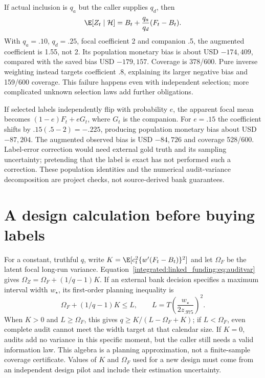 If actual inclusion is $q_a$ but the caller supplies $q_d$, then
\begin{equation}
 \E[Z_t\mid\mathcal H]
  =B_t+\frac{q_a}{q_d}(F_t-B_t).\label{integrated:linked_funding:eq:wrongq}
\end{equation}
With $q_a=.10$, $q_d=.25$, focal coefficient 2 and companion .5, the
augmented coefficient is 1.55, not 2. Its population monetary bias is about
USD $-174{,}409$, compared with the saved bias USD $-179{,}157$. Coverage
is 378/600. Pure inverse weighting instead targets coefficient .8, explaining
its larger negative bias and 159/600 coverage. This failure happens even
with independent selection; more complicated unknown selection laws add
further obligations.

If selected labels independently flip with probability $e$, the apparent
focal mean becomes $(1-e)F_t+eG_t$, where $G_t$ is the companion. For $e=.15$
the coefficient shifts by $.15(.5-2)=-.225$, producing population monetary
bias about USD $-87{,}204$. The augmented observed bias is USD $-84{,}726$
and coverage 528/600. Label-error correction would need external gold truth
and its sampling uncertainty; pretending that the label is exact has not
performed such a correction. These population identities and the numerical
audit-variance decomposition are project checks, not source-derived bank
guarantees.

\section{A design calculation before buying labels}

For a constant, truthful $q$, write
$K=\E[c_t^2\{w'(F_t-B_t)\}^2]$ and let $\Omega_F$ be the latent focal
long-run variance. Equation~\eqref{integrated:linked_funding:eq:auditvar} gives
$\Omega_Z=\Omega_F+(1/q-1)K$. If an external bank decision specifies a
maximum interval width $w_\star$, its first-order planning inequality is
\begin{equation}
 \Omega_F+(1/q-1)K\le
 L,\qquad L=T\left(\frac{w_\star}{2z_{.975}}\right)^2.
\end{equation}
When $K>0$ and $L\ge\Omega_F$, this gives
$q\ge K/(L-\Omega_F+K)$; if $L<\Omega_F$, even complete audit cannot meet
the width target at that calendar size. If $K=0$, audits add no variance in
this specific moment, but the caller still needs a valid information law.
This algebra is a planning approximation, not a finite-sample coverage
certificate. Values of $K$ and $\Omega_F$ used for a new design must come from
an independent design pilot and include their estimation uncertainty.

